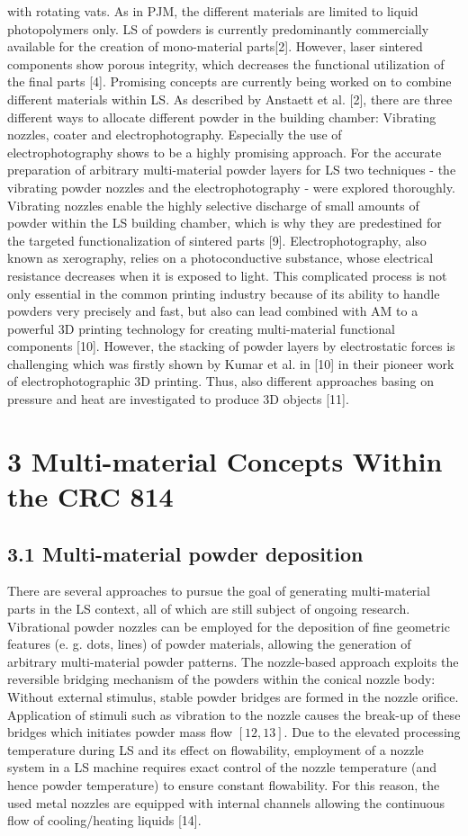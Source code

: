 \documentclass[10pt]{article}
\begin{document}
with rotating vats. As in PJM, the different materials are limited to liquid photopolymers only. LS of powders is currently predominantly commercially available for the creation of mono-material parts[2]. However, laser sintered components show porous integrity, which decreases the functional utilization of the final parts [4]. Promising concepts are currently being worked on to combine different materials within LS. As described by Anstaett et al. [2], there are three different ways to allocate different powder in the building chamber: Vibrating nozzles, coater and electrophotography. Especially the use of\\
electrophotography shows to be a highly promising approach. For the accurate preparation of arbitrary multi-material powder layers for LS two techniques - the vibrating powder nozzles and the electrophotography - were explored thoroughly. Vibrating nozzles enable the highly selective discharge of small amounts of powder within the LS building chamber, which is why they are predestined for the targeted functionalization of sintered parts [9]. Electrophotography, also known as xerography, relies on a photoconductive substance, whose electrical resistance decreases when it is exposed to light. This complicated process is not only essential in the common printing industry because of its ability to handle powders very precisely and fast, but also can lead combined with AM to a powerful 3D printing technology for creating multi-material functional components [10]. However, the stacking of powder layers by electrostatic forces is challenging which was firstly shown by Kumar et al. in [10] in their pioneer work of electrophotographic 3D printing. Thus, also different approaches basing on pressure and heat are investigated to produce 3D objects [11].

\section*{3 Multi-material Concepts Within the CRC 814}
\subsection*{3.1 Multi-material powder deposition}
There are several approaches to pursue the goal of generating multi-material parts in the LS context, all of which are still subject of ongoing research. Vibrational powder nozzles can be employed for the deposition of fine geometric features (e. g. dots, lines) of powder materials, allowing the generation of arbitrary multi-material powder patterns. The nozzle-based approach exploits the reversible bridging mechanism of the powders within the conical nozzle body: Without external stimulus, stable powder bridges are formed in the nozzle orifice. Application of stimuli such as vibration to the nozzle causes the break-up of these bridges which initiates powder mass flow $[12,13]$. Due to the elevated processing temperature during LS and its effect on flowability, employment of a nozzle system in a LS machine requires exact control of the nozzle temperature (and hence powder temperature) to ensure constant flowability. For this reason, the used metal nozzles are equipped with internal channels allowing the continuous flow of cooling/heating liquids [14].
\end{document}
